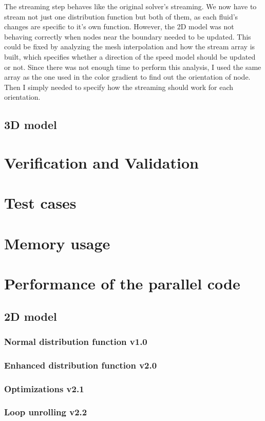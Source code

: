 \documentclass[12pt]{book}
\begin{document}
The streaming step behaves like the original solver's streaming. We now have to stream not just one distribution function but both of them, as each fluid's changes are specific to it's own function. However, the 2D model was not behaving correctly when nodes near the boundary needed to be updated. This could be fixed by analyzing the mesh interpolation and how the stream array is built, which specifies whether a direction of the speed model should be updated or not. Since there was not enough time to perform this analysis, I used the same array as the one used in the color gradient to find out the orientation of node. Then I simply needed to specify how the streaming should work for each orientation.   

\subsection{3D model}
\section{Verification and Validation}
\section{Test cases}\label{sec:testcases}
\section{Memory usage}
\section{Performance of the parallel code}\label{sec:performance}
\subsection{2D model}
\subsubsection{Normal distribution function v1.0}
\subsubsection{Enhanced distribution function v2.0}
\subsubsection{Optimizations v2.1}
\subsubsection{Loop unrolling v2.2}
\end{document}
